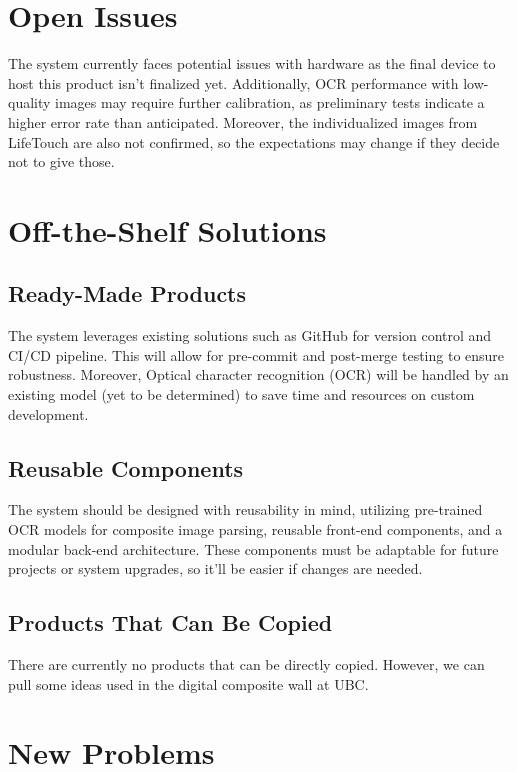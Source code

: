 \documentclass[12pt]{article}
\begin{document}
\section{Open Issues}

The system currently faces potential issues with hardware as the final device to host this product isn’t finalized yet. Additionally, OCR performance with low-quality images may require further calibration, as preliminary tests indicate a higher error rate than anticipated. Moreover, the individualized images from LifeTouch are also not confirmed, so the expectations may change if they decide not to give those.

\section{Off-the-Shelf Solutions}

\subsection{Ready-Made Products}

The system leverages existing solutions such as GitHub for version control and CI/CD pipeline. This will allow for pre-commit and post-merge testing to ensure robustness. Moreover, Optical character recognition (OCR) will be handled by an existing model (yet to be determined) to save time and resources on custom development.

\subsection{Reusable Components}

The system should be designed with reusability in mind, utilizing pre-trained OCR models for composite image parsing, reusable front-end components, and a modular back-end architecture. These components must be adaptable for future projects or system upgrades, so it’ll be easier if changes are needed.

\subsection{Products That Can Be Copied}

There are currently no products that can be directly copied. However, we can pull some ideas used in the digital composite wall at UBC.

\section{New Problems}
\end{document}
